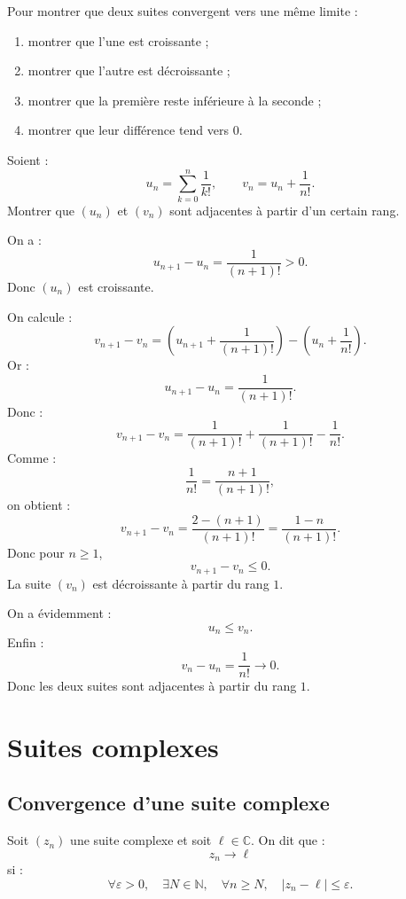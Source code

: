 \documentclass[11pt,a4paper]{article}
\newcommand{\N}{\mathbb N}
\newcommand{\C}{\mathbb C}
\newcommand{\abs}[1]{\left|#1\right|}
\begin{document}
\begin{methodbox}
Pour montrer que deux suites convergent vers une même limite :
\begin{enumerate}
    \item montrer que l'une est croissante ;
    \item montrer que l'autre est décroissante ;
    \item montrer que la première reste inférieure à la seconde ;
    \item montrer que leur différence tend vers \(0\).
\end{enumerate}
\end{methodbox}

\begin{exercicebox}
Soient :
\[
u_n=\sum_{k=0}^n\frac1{k!},
\qquad
v_n=u_n+\frac1{n!}.
\]
Montrer que \((u_n)\) et \((v_n)\) sont adjacentes à partir d'un certain rang.
\end{exercicebox}

\begin{correctionbox}
On a :
\[
u_{n+1}-u_n=\frac1{(n+1)!}>0.
\]
Donc \((u_n)\) est croissante.

On calcule :
\[
v_{n+1}-v_n
=
\left(u_{n+1}+\frac1{(n+1)!}\right)
-
\left(u_n+\frac1{n!}\right).
\]
Or :
\[
u_{n+1}-u_n=\frac1{(n+1)!}.
\]
Donc :
\[
v_{n+1}-v_n
=
\frac1{(n+1)!}+\frac1{(n+1)!}-\frac1{n!}.
\]
Comme :
\[
\frac1{n!}=\frac{n+1}{(n+1)!},
\]
on obtient :
\[
v_{n+1}-v_n
=
\frac{2-(n+1)}{(n+1)!}
=
\frac{1-n}{(n+1)!}.
\]
Donc pour \(n\geq1\),
\[
v_{n+1}-v_n\leq0.
\]
La suite \((v_n)\) est décroissante à partir du rang \(1\).

On a évidemment :
\[
u_n\leq v_n.
\]
Enfin :
\[
v_n-u_n=\frac1{n!}\to0.
\]
Donc les deux suites sont adjacentes à partir du rang \(1\).
\end{correctionbox}

\section{Suites complexes}

\subsection{Convergence d'une suite complexe}

\begin{definitionbox}
Soit \((z_n)\) une suite complexe et soit \(\ell\in\C\).  
On dit que :
\[
z_n\to\ell
\]
si :
\[
\forall\varepsilon>0,\quad \exists N\in\N,\quad \forall n\geq N,\quad \abs{z_n-\ell}\leq\varepsilon.
\]
\end{definitionbox}
\end{document}
